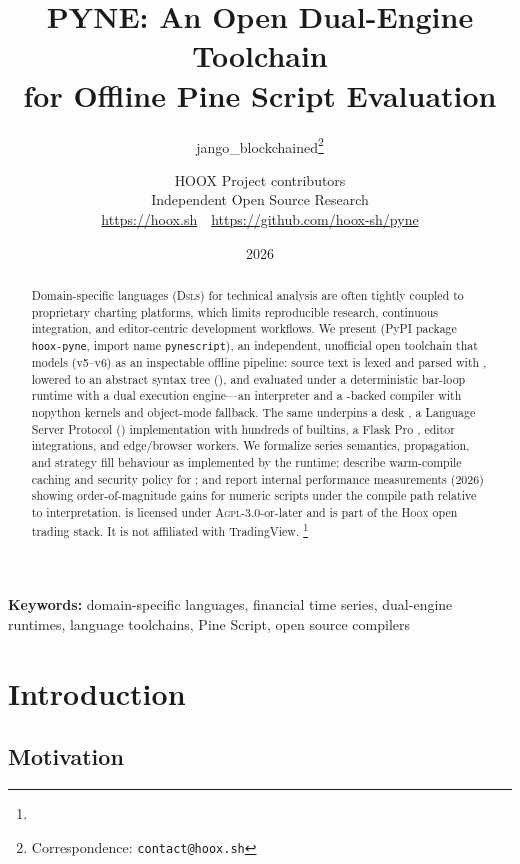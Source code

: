 \documentclass[11pt,a4paper]{article}
\title{%
  \textbf{PYNE: An Open Dual-Engine Toolchain\\for Offline Pine Script Evaluation}%
}
\author{%
  jango\_blockchained\thanks{Correspondence: \texttt{contact@hoox.sh}}
  \and
  HOOX Project contributors\\
  \small Independent Open Source Research\\
  \small \url{https://hoox.sh}~\textperiodcentered~\url{https://github.com/hoox-sh/pyne}
}
\date{2026}
\begin{document}
\maketitle

\begin{abstract}
Domain-specific languages (\textsc{Dsl}s) for technical analysis are often
tightly coupled to proprietary charting platforms, which limits reproducible
research, continuous integration, and editor-centric development workflows.
We present \pyne{} (PyPI package \texttt{hoox-pyne}, import name
\texttt{pynescript}), an independent, unofficial open toolchain that models
\pine{} (v5--v6) as an inspectable offline pipeline:
source text is lexed and parsed with \antlr{}, lowered to an
\asdl{} abstract syntax tree (\ast{}), and evaluated under a deterministic
bar-loop runtime with a dual execution engine---an \ast{} interpreter and a
\numba{}-backed compiler with nopython kernels and object-mode fallback.
The same \ast{} underpins a desk \cli{}, a Language Server Protocol (\lsp{})
implementation with hundreds of builtins, a Flask Pro \api{}, editor
integrations, and edge/browser workers.
We formalize series semantics, \na{} propagation, and strategy fill behaviour
as implemented by the runtime; describe warm-compile caching and security
policy for ; and report internal performance
measurements (2026) showing order-of-magnitude gains for numeric scripts under
the compile path relative to interpretation.
\pyne{} is licensed under \textsc{Agpl}-3.0-or-later and is part of the
\textsc{Hoox} open trading stack. It is not affiliated with TradingView.
\footnote{\trademarknote}
\end{abstract}

\noindent\textbf{Keywords:}
domain-specific languages, financial time series, dual-engine runtimes,
language toolchains, Pine Script, open source compilers

\tableofcontents
\newpage

\section{Introduction}
\label{sec:intro}

\subsection{Motivation}
\label{sec:motivation}
\end{document}
